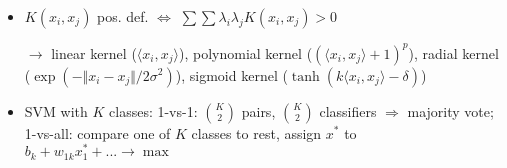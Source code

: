 \documentclass[10pt,landscape,a4paper]{article}
\begin{document}
\begin{multicols*}{4}
\begin{itemize}
	\item $K(x_i,x_j)$ pos. def. $\Leftrightarrow$ $\sum\sum \lambda_i\lambda_j K(x_i,x_j) > 0$
	\item[$\to$] linear kernel ($\langle x_i,x_j\rangle$), polynomial kernel ($(\langle x_i,x_j\rangle + 1)^p$), radial kernel ($\exp(-\Vert x_i-x_j\Vert/2\sigma^2)$), sigmoid kernel ($\tanh(k\langle x_i,x_j\rangle - \delta)$)
	\item SVM with $K$ classes: 1-vs-1: $\binom{K}{2}$ pairs, $\binom{K}{2}$ classifiers $\Rightarrow$ majority vote; 1-vs-all: compare one of $K$ classes to rest, assign $x^\ast$ to $b_k + w_{1k}x_1^\ast + ...\to\max$
\end{itemize}

\end{multicols*}
\end{document}
